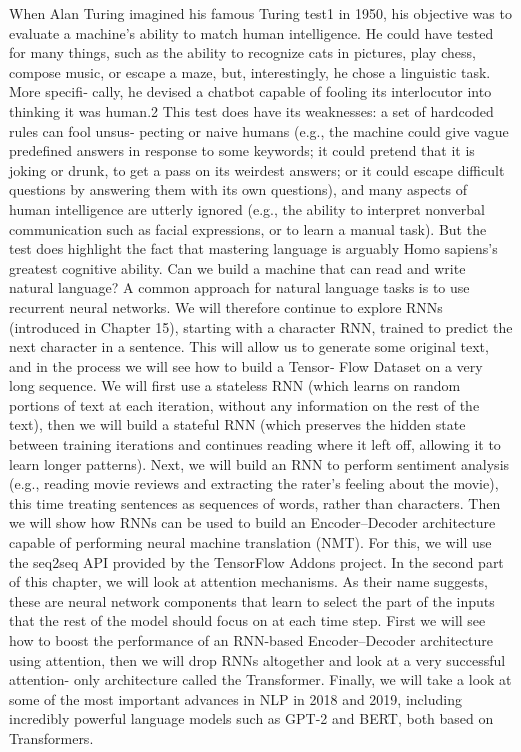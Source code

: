 \documentclass[12pt,letterpaper,twoside,twocolumn]{article}
\begin{document}
When Alan Turing imagined his famous Turing test1 in 1950, his objective was to evaluate a machine’s ability to match human intelligence. He could have tested for many things, such as the ability to recognize cats in pictures, play chess, compose music, or escape a maze, but, interestingly, he chose a linguistic task. More specifi‐ cally, he devised a chatbot capable of fooling its interlocutor into thinking it was human.2 This test does have its weaknesses: a set of hardcoded rules can fool unsus‐ pecting or naive humans (e.g., the machine could give vague predefined answers in response to some keywords; it could pretend that it is joking or drunk, to get a pass on its weirdest answers; or it could escape difficult questions by answering them with its own questions), and many aspects of human intelligence are utterly ignored (e.g., the ability to interpret nonverbal communication such as facial expressions, or to learn a manual task). But the test does highlight the fact that mastering language is arguably Homo sapiens’s greatest cognitive ability. Can we build a machine that can read and write natural language?
A common approach for natural language tasks is to use recurrent neural networks. We will therefore continue to explore RNNs (introduced in Chapter 15), starting with a character RNN, trained to predict the next character in a sentence. This will allow us to generate some original text, and in the process we will see how to build a Tensor‐ Flow Dataset on a very long sequence. We will first use a stateless RNN (which learns on random portions of text at each iteration, without any information on the rest of the text), then we will build a stateful RNN (which preserves the hidden state between training iterations and continues reading where it left off, allowing it to learn longer patterns). Next, we will build an RNN to perform sentiment analysis (e.g., reading movie reviews and extracting the rater’s feeling about the movie), this time treating sentences as sequences of words, rather than characters. Then we will show how RNNs can be used to build an Encoder–Decoder architecture capable of performing neural machine translation (NMT). For this, we will use the seq2seq API provided by the TensorFlow Addons project.
In the second part of this chapter, we will look at attention mechanisms. As their name suggests, these are neural network components that learn to select the part of the inputs that the rest of the model should focus on at each time step. First we will see how to boost the performance of an RNN-based Encoder–Decoder architecture using attention, then we will drop RNNs altogether and look at a very successful attention- only architecture called the Transformer. Finally, we will take a look at some of the most important advances in NLP in 2018 and 2019, including incredibly powerful language models such as GPT-2 and BERT, both based on Transformers.
\end{document}
